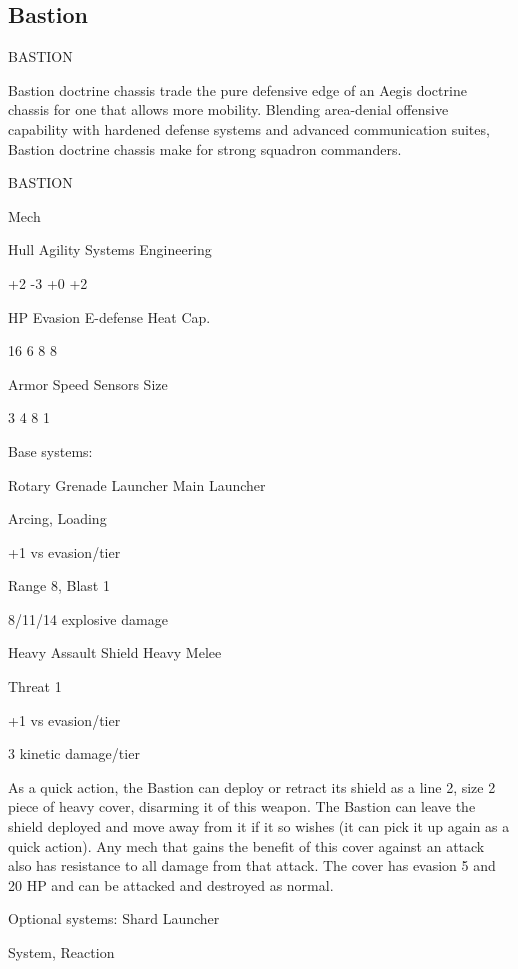 \subsection{Bastion}

                                               BASTION  

Bastion doctrine chassis trade the pure defensive edge of an Aegis doctrine chassis for one that  
allows more mobility. Blending area-denial offensive capability with hardened defense systems  
and advanced communication suites, Bastion doctrine chassis make for strong squadron  
commanders.   

 BASTION 

 Mech 

 Hull       Agility     Systems       Engineering 

 +2         -3          +0            +2 

 HP         Evasion      E-defense    Heat Cap. 

 16         6           8             8 

 Armor      Speed       Sensors       Size 

 3          4           8             1 

Base systems:
 
Rotary Grenade Launcher  
Main Launcher
 
Arcing, Loading
 
+1 vs evasion/tier
 
Range 8, Blast 1
 
8/11/14 explosive damage
 

Heavy Assault Shield  
Heavy Melee
 
Threat 1
 
+1 vs evasion/tier
 
3 kinetic damage/tier
 
As a quick action, the Bastion can deploy or retract its shield as a line 2, size 2 piece of heavy  
cover, disarming it of this weapon. The Bastion can leave the shield deployed and move away  
from it if it so wishes (it can pick it up again as a quick action). Any mech that gains the benefit of  
this cover against an attack also has resistance to all damage from that attack. The cover has  
evasion 5 and 20 HP and can be attacked and destroyed as normal.
 

Optional systems:  
Shard Launcher
 
System, Reaction
 

                                                                                                         


